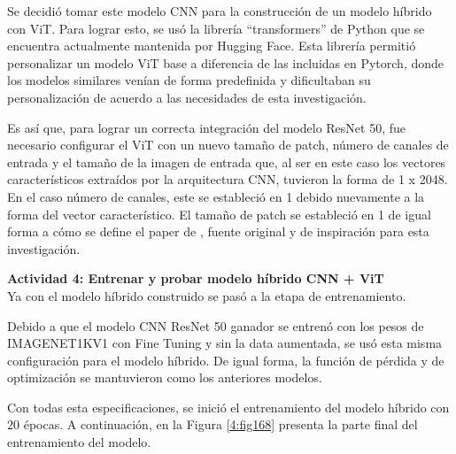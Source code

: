 Se decidió tomar este modelo CNN para la construcción de un modelo híbrido con ViT. Para lograr esto, se usó la librería “transformers” de Python que se encuentra actualmente mantenida por Hugging Face. Esta librería permitió personalizar un modelo ViT base a diferencia de las incluidas en Pytorch, donde los modelos similares venían de forma predefinida y dificultaban su personalización de acuerdo a las necesidades de esta investigación.

Es así que, para lograr un correcta integración del modelo ResNet 50, fue necesario configurar el ViT con un nuevo tamaño de patch, número de canales de entrada y el tamaño de la imagen de entrada que, al ser en este caso los vectores característicos extraídos por la arquitectura CNN, tuvieron la forma de 1 x 2048. En el caso número de canales, este se estableció en 1 debido nuevamente a la forma del vector característico. El tamaño de patch se estableció en 1 de igual forma a cómo se define el paper de \cite{pr_JERBI2023autoclassViTGAN}, fuente original y de inspiración para esta investigación.

\textbf{Actividad 4: Entrenar y probar modelo híbrido CNN + ViT}
\\
Ya con el modelo híbrido construido se pasó a la etapa de entrenamiento.

Debido a que el modelo CNN ResNet 50 ganador se entrenó con los pesos de IMAGENET1KV1 con Fine Tuning y sin la data aumentada, se usó esta misma configuración para el modelo híbrido. De igual forma, la función de pérdida y de optimización se mantuvieron como los anteriores modelos.

Con todas esta especificaciones, se inició el entrenamiento del modelo híbrido con 20 épocas. A continuación, en la Figura \ref{4:fig168} presenta la parte final del entrenamiento del modelo.

